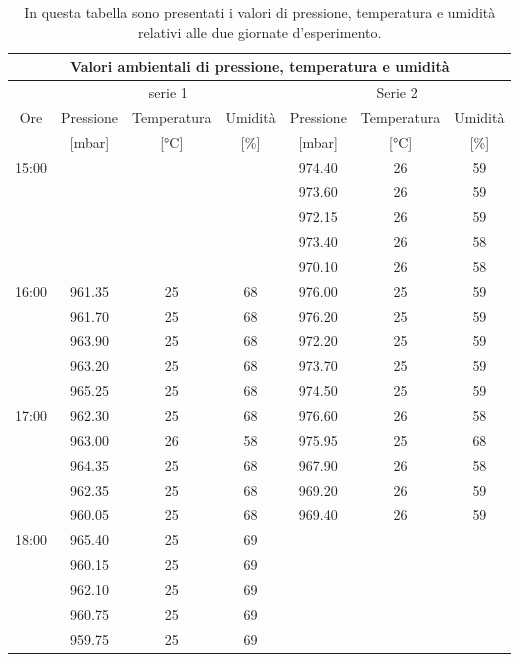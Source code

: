 \begin{table}[p]
    \begin{tabular}{c | c c c | c c c}
	    \multicolumn{7}{c}{\textbf{Valori ambientali di pressione, temperatura e umidità}} \\
        \toprule
        \multicolumn{1}{c}{} & \multicolumn{3}{c}{serie 1} & \multicolumn{3}{c}{Serie 2} \\
        Ore & Pressione & Temperatura & Umidità & Pressione & Temperatura & Umidità \\
         & [\si{\milli\bar}] & [\si{\celsius}] & [\%] & [\si{\milli\bar}] & [\si{\celsius}] & [\%] \\
        \midrule
        \multirow{5}{*}{15:00} & $\,$ & $\,$ & $\,$ & 974.40 & 26 & 59 \\
         & $\,$ & $\,$ & $\,$ & 973.60 & 26 & 59 \\
         & $\,$ & $\,$ & $\,$ & 972.15 & 26 & 59 \\
         & $\,$ & $\,$ & $\,$ & 973.40 & 26 & 58 \\
         & $\,$ & $\,$ & $\,$ & 970.10 & 26 & 58 \\
        \midrule
        \multirow{5}{*}{16:00} & 961.35 & 25 & 68 & 976.00 & 25 & 59 \\
         & 961.70 & 25 & 68 & 976.20 & 25 & 59 \\
         & 963.90 & 25 & 68 & 972.20 & 25 & 59 \\
         & 963.20 & 25 & 68 & 973.70 & 25 & 59 \\
         & 965.25 & 25 & 68 & 974.50 & 25 & 59 \\
        \midrule
        \multirow{5}{*}{17:00} & 962.30 & 25 & 68 & 976.60 & 26 & 58 \\
         & 963.00 & 26 & 58 & 975.95 & 25 & 68 \\
         & 964.35 & 25 & 68 & 967.90 & 26 & 58\\
         & 962.35 & 25 & 68 & 969.20 & 26 & 59\\
         & 960.05 & 25 & 68 & 969.40 & 26 & 59 \\
        \midrule
        \multirow{5}{*}{18:00} & 965.40 & 25 & 69 & $\,$ & $\,$ & $\,$ \\
         & 960.15 & 25 & 69 & $\,$ & $\,$ & $\,$ \\
         & 962.10 & 25 & 69 & $\,$ & $\,$ & $\,$ \\
         & 960.75 & 25 & 69 & $\,$ & $\,$ & $\,$ \\
         & 959.75 & 25 & 69 & $\,$ & $\,$ & $\,$ \\
        \bottomrule
    \end{tabular}


    \caption{In questa tabella sono presentati i valori di pressione, temperatura e umidità relativi alle due giornate d'esperimento.}
    \label{tab:ptu}
\end{table}
